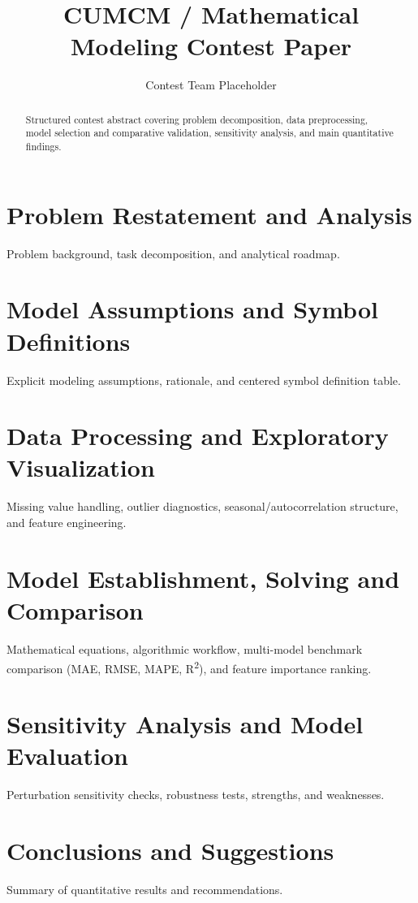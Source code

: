 \documentclass[12pt,a4paper]{article}
\title{CUMCM / Mathematical Modeling Contest Paper}
\author{Contest Team Placeholder}
\date{}
\begin{document}
\maketitle

\begin{abstract}
Structured contest abstract covering problem decomposition, data preprocessing, model selection and comparative validation, sensitivity analysis, and main quantitative findings.
\end{abstract}

\newpage

\section{Problem Restatement and Analysis}
Problem background, task decomposition, and analytical roadmap.

\section{Model Assumptions and Symbol Definitions}
Explicit modeling assumptions, rationale, and centered symbol definition table.

\section{Data Processing and Exploratory Visualization}
Missing value handling, outlier diagnostics, seasonal/autocorrelation structure, and feature engineering.

\section{Model Establishment, Solving and Comparison}
Mathematical equations, algorithmic workflow, multi-model benchmark comparison (MAE, RMSE, MAPE, R\textsuperscript{2}), and feature importance ranking.

\section{Sensitivity Analysis and Model Evaluation}
Perturbation sensitivity checks, robustness tests, strengths, and weaknesses.

\section{Conclusions and Suggestions}
Summary of quantitative results and recommendations.



\end{document}
